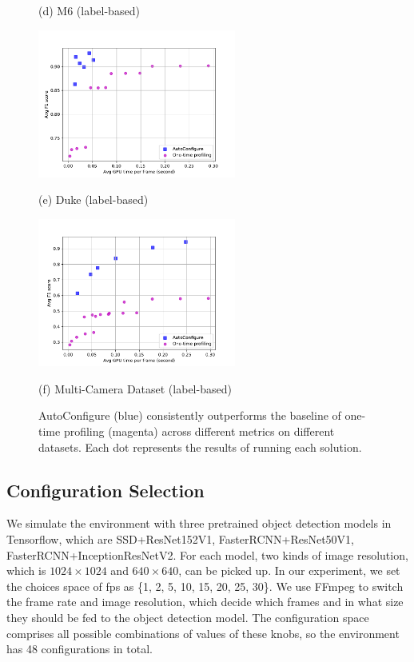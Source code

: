 \begin{figure}[!t]
\begin{minipage}[t]{0.32\linewidth}
		\centerline{(d) M6 (label-based)}
	\end{minipage}
	\hfill
	\begin{minipage}[t]{0.32\linewidth}
		\centerline{\includegraphics[width=6.5cm]{figures/duke_label.pdf}}
		\centerline{(e) Duke (label-based)}
	\end{minipage}
	\hfill
	\begin{minipage}[t]{0.32\linewidth}
		\centerline{\includegraphics[width=6.5cm]{figures/_Westbound_Eastbound_Rear_label.pdf}}
		\centerline{(f) Multi-Camera Dataset (label-based)}
	\end{minipage}		
	\caption{AutoConfigure (blue) consistently outperforms the baseline of one-time profiling (magenta) across different metrics on different datasets. Each dot represents the results of running each solution.}
	\label{fig: results}
\end{figure}

\subsection{Configuration Selection}
\label{subsec: configuration}
We simulate the environment \cite{trade-offs} with three pretrained object detection models in Tensorflow, which are SSD+ResNet152V1, FasterRCNN+ResNet50V1, FasterRCNN+InceptionResNetV2. For each model, two kinds of image resolution, which is $1024\times1024$ and $640\times640$, can be picked up. In our experiment, we set the choices space of fps as \{1, 2, 5, 10, 15, 20, 25, 30\}. We use FFmpeg \cite{ffmpeg} to switch the frame rate and image resolution, which decide which frames and in what size they should be fed to the object detection model. The configuration space comprises all possible combinations of values of these knobs, so the environment has 48 configurations in total.

